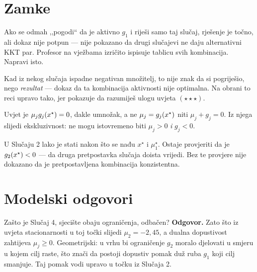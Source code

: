 \section{Zamke}
\label{sec:z1b-zamke}

\begin{zamka}
Ako se odmah ,,pogodi`` da je aktivno $g_1$ i riješi samo taj slučaj, rješenje je
točno, ali dokaz nije potpun --- nije pokazano da drugi slučajevi ne daju
alternativni KKT par. Profesor na vježbama izričito ispisuje tablicu svih
kombinacija. Napravi isto.
\end{zamka}

\begin{zamka}
Kad iz nekog slučaja ispadne negativan množitelj, to nije znak da si pogriješio,
nego \emph{rezultat} --- dokaz da ta kombinacija aktivnosti nije optimalna. Na
obrani to reci upravo tako, jer pokazuje da razumiješ ulogu uvjeta
$(\star\star\star)$.
\end{zamka}

\begin{zamka}
Uvjet je $\mu_j g_j(x^{\star}) = 0$, dakle umnožak, a ne $\mu_j = g_j(x^{\star})$ niti
$\mu_j + g_j = 0$. Iz njega slijedi ekskluzivnost: ne mogu istovremeno biti
$\mu_j > 0$ \emph{i} $g_j < 0$.
\end{zamka}

\begin{zamka}
U Slučaju 2 lako je stati nakon što se nađu $x^{\star}$ i $\mu_1^{\star}$. Ostaje
provjeriti da je $g_2(x^{\star}) < 0$ --- da druga pretpostavka slučaja doista vrijedi.
Bez te provjere nije dokazano da je pretpostavljena kombinacija konzistentna.
\end{zamka}

\section{Modelski odgovori}
\label{sec:z1b-odgovori}

\begin{pitanje}{Zašto je Slučaj 4, sjecište obaju ograničenja, odbačen?}
\textbf{Odgovor.} Zato što iz uvjeta stacionarnosti u toj točki slijedi
$\mu_2 = -2{,}45$, a dualna dopustivost zahtijeva $\mu_j \geq 0$. Geometrijski:
u vrhu bi ograničenje $g_2$ moralo djelovati u smjeru u kojem cilj raste, što
znači da postoji dopustiv pomak duž ruba $g_1$ koji cilj smanjuje. Taj pomak vodi
upravo u točku iz Slučaja 2.
\end{pitanje}

